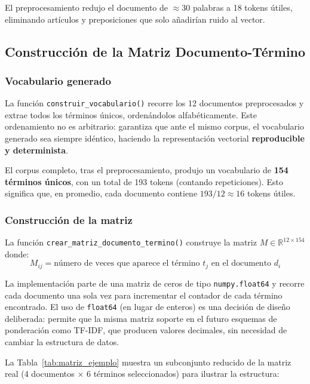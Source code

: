 El preprocesamiento redujo el documento de $\approx$30 palabras a 18 tokens útiles, eliminando artículos y preposiciones que solo añadirían ruido al vector.

\subsection{Construcción de la Matriz Documento-Término}

\subsubsection{Vocabulario generado}

La función \texttt{construir\_vocabulario()} recorre los 12 documentos preprocesados y extrae todos los términos únicos, ordenándolos alfabéticamente. Este ordenamiento no es arbitrario: garantiza que ante el mismo corpus, el vocabulario generado sea siempre idéntico, haciendo la representación vectorial \textbf{reproducible y determinista}.

El corpus completo, tras el preprocesamiento, produjo un vocabulario de \textbf{154 términos únicos}, con un total de 193 tokens (contando repeticiones). Esto significa que, en promedio, cada documento contiene $193 / 12 \approx 16$ tokens útiles.

\subsubsection{Construcción de la matriz}

La función \texttt{crear\_matriz\_documento\_termino()} construye la matriz $M \in \mathbb{R}^{12 \times 154}$ donde:
\[
M_{ij} = \text{número de veces que aparece el término } t_j \text{ en el documento } d_i
\]

La implementación parte de una matriz de ceros de tipo \texttt{numpy.float64} y recorre cada documento una sola vez para incrementar el contador de cada término encontrado. El uso de \texttt{float64} (en lugar de enteros) es una decisión de diseño deliberada: permite que la misma matriz soporte en el futuro esquemas de ponderación como TF-IDF, que producen valores decimales, sin necesidad de cambiar la estructura de datos.

La Tabla~\ref{tab:matriz_ejemplo} muestra un subconjunto reducido de la matriz real (4 documentos × 6 términos seleccionados) para ilustrar la estructura:


